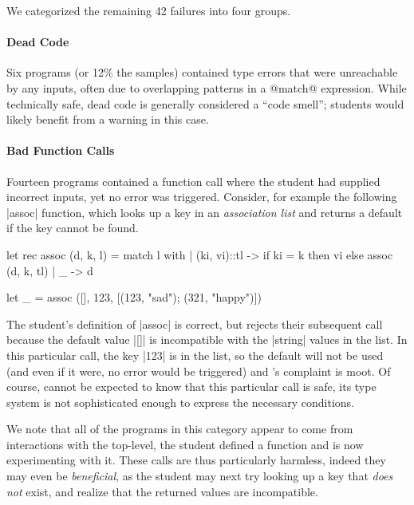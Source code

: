 We categorized the remaining 42 failures into four groups.

\paragraph{Dead Code}
%
Six programs (or 12\% the samples) contained type errors that were
unreachable by any inputs, often due to overlapping patterns in a
@match@ expression.
%
While technically safe, dead code is generally considered a ``code
smell''; students would likely benefit from a warning in this case.

\paragraph{Bad Function Calls}
Fourteen programs contained a function call where the student had
supplied incorrect inputs, yet no error was triggered.
%
Consider, for example the following |assoc| function, which
looks up a key in an \emph{association list} and returns a default if
the key cannot be found.
%
\begin{code}
  let rec assoc (d, k, l) = match l with
    | (ki, vi)::tl ->
       if ki = k then
         vi
       else
         assoc (d, k, tl)
    | _ -> d

  let _ = assoc ([], 123, [(123, "sad"); (321, "happy")])
\end{code}
%
The student's definition of |assoc| is correct, but \ocaml rejects their
subsequent call because the default value |[]| is incompatible with the
|string| values in the list.
%
In this particular call, the key |123| is in the list, so the default
will not be used (and even if it were, no error would be triggered) and
\ocaml's complaint is moot.
%
Of course, \ocaml cannot be expected to know that this particular call
is safe, its type system is not sophisticated enough to express the
necessary conditions.

We note that all of the programs in this category appear to come from
interactions with the \ocaml top-level, \ie the student defined a
function and is now experimenting with it.
%
These calls are thus particularly harmless, indeed they may even be
\emph{beneficial}, as the student may next try looking up a key that
\emph{does not} exist, and realize that the returned values are
incompatible.



